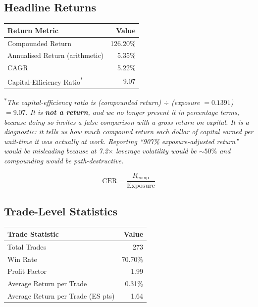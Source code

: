 \documentclass[11pt]{article}
\begin{document}
\subsection{Headline Returns}

\begin{center}
\small
\begin{tabular}{l r}
\toprule
\textbf{Return Metric} & \textbf{Value}\\
\midrule
Compounded Return                 & 126.20\%\\
Annualised Return (arithmetic)    & 5.35\%\\
CAGR                              & 5.22\%\\
Capital-Efficiency Ratio\textsuperscript{*} & 9.07\\
\bottomrule
\end{tabular}
\end{center}

\footnotesize\textsuperscript{*}\textit{The capital-efficiency ratio is
(compounded return) $\div$ (exposure $= 0.1391$) $= 9.07$. It is
\textbf{not a return}, and we no longer present it in percentage terms,
because doing so invites a false comparison with a gross return on capital.
It is a diagnostic: it tells us how much compound return each dollar of
capital earned per unit-time it was actually at work. Reporting ``907\%
exposure-adjusted return'' would be misleading because at 7.2$\times$ leverage
volatility would be $\sim 50\%$ and compounding would be path-destructive.}
\normalsize

\begin{equation}
\mathrm{CER} = \frac{R_{\mathrm{comp}}}{\mathrm{Exposure}}
\end{equation}

\subsection{Trade-Level Statistics}

\begin{center}
\small
\begin{tabular}{l r}
\toprule
\textbf{Trade Statistic} & \textbf{Value}\\
\midrule
Total Trades                      & 273\\
Win Rate                          & 70.70\%\\
Profit Factor                     & 1.99\\
Average Return per Trade          & 0.31\%\\
Average Return per Trade (ES pts) & 1.64\\
\bottomrule
\end{tabular}
\end{center}
\end{document}
